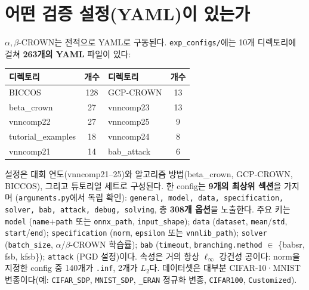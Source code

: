 \documentclass[10pt]{article}
\newcommand{\abc}{$\alpha,\beta$-CROWN}
\begin{document}
\section{어떤 검증 설정(YAML)이 있는가}
\abc{}는 전적으로 YAML로 구동된다. \texttt{exp\_configs/}에는 10개 디렉토리에 걸쳐
\textbf{263개의 YAML} 파일이 있다:

\begin{table}[H]\centering\small
\begin{tabular}{lc lc}
\toprule
디렉토리 & 개수 & 디렉토리 & 개수 \\
\midrule
BICCOS & 128 & GCP-CROWN & 13 \\
beta\_crown & 27 & vnncomp23 & 13 \\
vnncomp22 & 27 & vnncomp25 & 9 \\
tutorial\_examples & 18 & vnncomp24 & 8 \\
vnncomp21 & 14 & bab\_attack & 6 \\
\bottomrule
\end{tabular}
\end{table}

설정은 대회 연도(vnncomp21--25)와 알고리즘 방법(beta\_crown, GCP-CROWN, BICCOS), 그리고
튜토리얼 세트로 구성된다. 한 config는 \textbf{9개의 최상위 섹션}을 가지며
(\texttt{arguments.py}에서 독립 확인): \texttt{general, model, data, specification, solver,
bab, attack, debug, solving}, 총 \textbf{308개 옵션}을 노출한다. 주요 키는 \texttt{model}
(\texttt{name}+\texttt{path} 또는 \texttt{onnx\_path}, \texttt{input\_shape}); \texttt{data}
(\texttt{dataset}, \texttt{mean}/\texttt{std}, \texttt{start}/\texttt{end});
\texttt{specification} (\texttt{norm}, \texttt{epsilon} 또는 \texttt{vnnlib\_path});
\texttt{solver} (\texttt{batch\_size}, $\alpha$/$\beta$-CROWN 학습률); \texttt{bab}
(\texttt{timeout}, \texttt{branching.method} $\in$ \{babsr, fsb, kfsb\}); \texttt{attack}
(PGD 설정)이다. 속성은 거의 항상 $\ell_\infty$ 강건성 공이다: norm을 지정한 config 중 140개가
\texttt{.inf}, 2개가 $L_2$다. 데이터셋은 대부분 CIFAR-10·MNIST 변종이다(예:
\texttt{CIFAR\_SDP}, \texttt{MNIST\_SDP}, \texttt{\_ERAN} 정규화 변종, \texttt{CIFAR100},
\texttt{Customized}).
\end{document}
